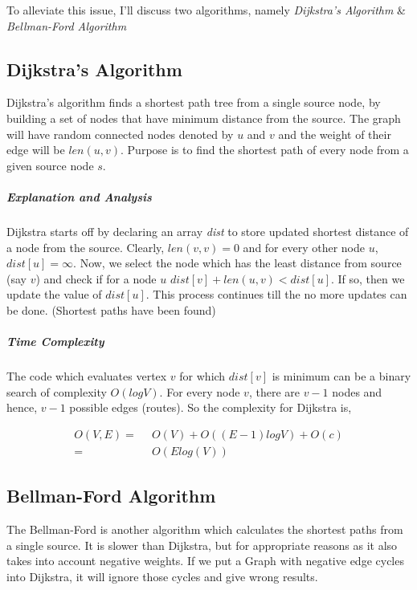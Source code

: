 \documentclass[11pt,a4paper]{extarticle}
\begin{document}
To alleviate this issue, I'll discuss two algorithms, namely \textit{Dijkstra's Algorithm} \& \textit{Bellman-Ford Algorithm}

\subsection{Dijkstra's Algorithm}
Dijkstra’s algorithm finds a shortest path tree from a single source node, by building a set of nodes that have minimum distance from the source. The graph will have random connected nodes denoted by $u$ and $v$ and the weight of their edge will be $len(u,v)$. Purpose is to find the shortest path of every node from a given source node $s$.

\begin{adjustwidth}{2.5em}{0pt}

\end{adjustwidth}

\subparagraph{Explanation and Analysis}
Dijkstra starts off by declaring an array \textit{dist} to store updated shortest distance of a node from the source. Clearly, $len(v,v) = 0$ and for every other node $u$, $dist[u] = \infty$. Now, we select the node which has the least distance from source (say $v$) and check if for a node $u$ $dist[v] + len(u,v) < dist[u]$. If so, then we update the value of $dist[u]$. This process continues till the no more updates can be done. (Shortest paths have been found)

\subparagraph{Time Complexity}
The code which evaluates vertex $v$ for which $dist[v]$ is minimum can be a binary search of complexity $O(logV)$. For every node $v$, there are $v-1$ nodes and hence, $v-1$ possible edges (routes). So the complexity for Dijkstra is,

\begin{align}
O(V,E) =& \,\,\,O(V) + O((E-1)logV) + O(c)\\
	   =& \,\,\,O(Elog(V))
\end{align}

\subsection{Bellman-Ford Algorithm}
The Bellman-Ford is another algorithm which calculates the shortest paths from a single source. It is slower than Dijkstra, but for appropriate reasons as it also takes into account negative weights. If we put a Graph with negative edge cycles into Dijkstra, it will ignore those cycles and give wrong results.
\end{document}
